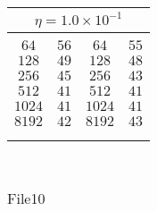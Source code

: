 \documentclass[10pt]{article}
\begin{document}
\begin{center}
\begin{table}[]
\begin{center}
\begin{tabular}{@{}cc|cc@{}}
\multicolumn{4}{c}{$\eta = 1.0\times 10^{-1}$} \\[5pt]
\hline\\[-11pt]
$64$ & $56$  & $64$ & $55$ \\ [1pt]
$128$ & $49$  & $128$ & $48$ \\ [1pt]
$256$ & $45$  & $256$ & $43$ \\ [1pt]
$512$ & $41$  & $512$ & $41$ \\ [1pt]
$1024$ & $41$  & $1024$ & $41$ \\ [1pt]
$8192$ & $42$  & $8192$ & $43$ \\ [1pt]
\hline\\[-11pt]

\hline\\[-8pt]
\end{tabular}\\[5pt]
\end{center}
\normalsize
\end{table}

\begin{table}[]
  \small
  \caption{File10}\label{tab:tab3}
\begin{center}
\begin{tabular}{@{}cc|cc@{}}


\end{tabular}
\end{center}
\end{table}
\end{center}
\end{document}
